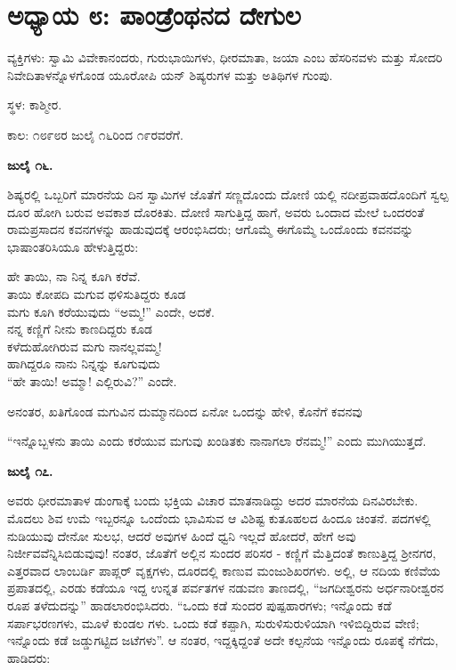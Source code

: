 
\chapter{ಅಧ್ಯಾಯ ೮: ಪಾಂಡ್ರೆಂಥನದ ದೇಗುಲ}

ವ್ಯಕ್ತಿಗಳು: ಸ್ವಾಮಿ ವಿವೇಕಾನಂದರು, ಗುರುಭಾಯಿಗಳು, ಧೀರಮಾತಾ, ಜಯಾ ಎಂಬ ಹೆಸರಿನವಳು ಮತ್ತು ಸೋದರಿ ನಿವೇದಿತಾಳನ್ನೊಳಗೊಂಡ ಯೂರೋಪಿ ಯನ್ ಶಿಷ್ಯರುಗಳ ಮತ್ತು ಅತಿಥಿಗಳ ಗುಂಪು.

ಸ್ಥಳ: ಕಾಶ್ಮೀರ.

ಕಾಲ: ೧೮೯೮ರ ಜುಲೈ ೧೬ರಿಂದ ೧೯ರವರೆಗೆ.

\textbf{ಜುಲೈ ೧೬.}

ಶಿಷ್ಯರಲ್ಲಿ ಒಬ್ಬರಿಗೆ ಮಾರನೆಯ ದಿನ ಸ್ವಾಮಿಗಳ ಜೊತೆಗೆ ಸಣ್ಣದೊಂದು ದೋಣಿ ಯಲ್ಲಿ ನದೀಪ್ರವಾಹದೊಂದಿಗೆ ಸ್ವಲ್ಪ ದೂರ ಹೋಗಿ ಬರುವ ಅವಕಾಶ ದೊರಕಿತು. ದೋಣಿ ಸಾಗುತ್ತಿದ್ದ ಹಾಗೆ, ಅವರು ಒಂದಾದ ಮೇಲೆ ಒಂದರಂತೆ ರಾಮಪ್ರಸಾದನ ಕವನಗಳನ್ನು ಹಾಡುವುದಕ್ಕೆ ಆರಂಭಿಸಿದರು; ಆಗೊಮ್ಮೆ ಈಗೊಮ್ಮೆ ಒಂದೊಂದು ಕವನವನ್ನು ಭಾಷಾಂತರಿಸಿಯೂ ಹೇಳುತ್ತಿದ್ದರು:

\begin{myquote}
ಹೇ ತಾಯಿ, ನಾ ನಿನ್ನ ಕೂಗಿ ಕರೆವೆ.\\ತಾಯಿ ಕೋಪದಿ ಮಗುವ ಥಳಿಸುತಿದ್ದರು ಕೂಡ\\ಮಗು ಕೂಗಿ ಕರೆಯುವುದು “ಅಮ್ಮ!” ಎಂದೇ, ಅದಕೆ.\\ನನ್ನ ಕಣ್ಣಿಗೆ ನೀನು ಕಾಣದಿದ್ದರು ಕೂಡ\\ಕಳೆದುಹೋಗಿರುವ ಮಗು ನಾನಲ್ಲವಮ್ಮ!\\ಹಾಗಿದ್ದರೂ ನಾನು ನಿನ್ನನ್ನು ಕೂಗುವುದು\\“ಹೇ ತಾಯಿ! ಅಮ್ಮಾ! ಎಲ್ಲಿರುವಿ?” ಎಂದೇ.
\end{myquote}

ಅನಂತರ, ಖತಿಗೊಂಡ ಮಗುವಿನ ದುಮ್ಮಾನದಿಂದ ಏನೋ ಒಂದನ್ನು ಹೇಳಿ, ಕೊನೆಗೆ ಕವನವು

“ಇನ್ನೊಬ್ಬಳನು ತಾಯಿ ಎಂದು ಕರೆಯುವ ಮಗುವು ಖಂಡಿತಕು ನಾನಾಗಲಾ ರೆನಮ್ಮ!” ಎಂದು ಮುಗಿಯುತ್ತದೆ.

\textbf{ಜುಲೈ ೧೭.}

ಅವರು ಧೀರಮಾತಾಳ ಡುಂಗಾಕ್ಕೆ ಬಂದು ಭಕ್ತಿಯ ವಿಚಾರ ಮಾತನಾಡಿದ್ದು ಅದರ ಮಾರನೆಯ ದಿನವಿರಬೇಕು. ಮೊದಲು ಶಿವ ಉಮೆ ಇಬ್ಬರನ್ನೂ ಒಂದೆಂದು ಭಾವಿಸುವ ಆ ವಿಶಿಷ್ಟ ಕುತೂಹಲದ ಹಿಂದೂ ಚಿಂತನೆ. ಪದಗಳಲ್ಲಿ ನುಡಿಯುವು ದೇನೋ ಸುಲಭ, ಆದರೆ ಅವುಗಳ ಹಿಂದೆ ಧ್ವನಿ ಇಲ್ಲದೆ ಹೋದರೆ, ಹೇಗೆ ಅವು ನಿರ್ಜೀವವೆನ್ನಿಸಿಬಿಡುವುವು! ನಂತರ, ಜೊತೆಗೆ ಅಲ್ಲಿನ ಸುಂದರ ಪರಿಸರ - ಕಣ್ಣಿಗೆ ಮೆತ್ತಿದಂತೆ ಕಾಣುತ್ತಿದ್ದ ಶ‍್ರೀನಗರ, ಎತ್ತರವಾದ ಲಾಂಬರ್ಡಿ ಪಾಪ್ಲರ್ ವೃಕ್ಷಗಳು, ದೂರದಲ್ಲಿ ಕಾಣುವ ಮಂಜುಶಿಖರಗಳು. ಅಲ್ಲಿ, ಆ ನದಿಯ ಕಣಿವೆಯ ಪ್ರಪಾತದಲ್ಲಿ, ಎರಡು ಕಡೆಯೂ ಇದ್ದ ಉನ್ನತ ಪರ್ವತಗಳ ನಡುವಣ ತಾಣದಲ್ಲಿ, “ಜಗದೀಶ್ವರನು ಅರ್ಧನಾರೀಶ್ವರನ ರೂಪ ತಳೆದುದನ್ನು” ಹಾಡಲಾರಂಭಿಸಿದರು. “ಒಂದು ಕಡೆ ಸುಂದರ ಪುಷ್ಪಹಾರಗಳು; ಇನ್ನೊಂದು ಕಡೆ ಸರ್ಪಾಭರಣಗಳು, ಮೂಳೆ ಕುಂಡಲ ಗಳು. ಒಂದು ಕಡೆ ಕಪ್ಪಾಗಿ, ಸುರುಳಿಸುರುಳಿಯಾಗಿ ಇಳಿಬಿದ್ದಿರುವ ವೇಣಿ; ಇನ್ನೊಂದು ಕಡೆ ಜಡ್ಡುಗಟ್ಟಿದ ಜಟೆಗಳು”. ಆ ನಂತರ, ಇದ್ದಕ್ಕಿದ್ದಂತೆ ಅದೇ ಕಲ್ಪನೆಯ ಇನ್ನೊಂದು ರೂಪಕ್ಕೆ ನೆಗೆದು, ಹಾಡಿದರು:

